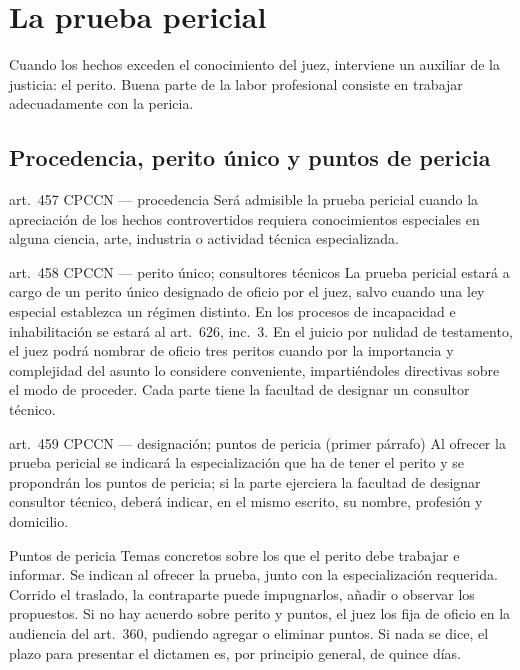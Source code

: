 \documentclass[12pt,oneside]{book}
\begin{document}
\chapter{La prueba pericial}

Cuando los hechos exceden el conocimiento del juez, interviene un auxiliar de la justicia: el perito. Buena parte de la labor profesional consiste en trabajar adecuadamente con la pericia.

\section{Procedencia, perito único y puntos de pericia}

\begin{regla}{art.~457 CPCCN --- procedencia}
Será admisible la prueba pericial cuando la apreciación de los hechos controvertidos requiera conocimientos especiales en alguna ciencia, arte, industria o actividad técnica especializada.
\end{regla}

\begin{regla}{art.~458 CPCCN --- perito único; consultores técnicos}
La prueba pericial estará a cargo de un perito único designado de oficio por el juez, salvo cuando una ley especial establezca un régimen distinto. En los procesos de incapacidad e inhabilitación se estará al art.~626, inc.~3. En el juicio por nulidad de testamento, el juez podrá nombrar de oficio tres peritos cuando por la importancia y complejidad del asunto lo considere conveniente, impartiéndoles directivas sobre el modo de proceder. Cada parte tiene la facultad de designar un consultor técnico.
\end{regla}

\begin{regla}{art.~459 CPCCN --- designación; puntos de pericia (primer párrafo)}
Al ofrecer la prueba pericial se indicará la especialización que ha de tener el perito y se propondrán los puntos de pericia; si la parte ejerciera la facultad de designar consultor técnico, deberá indicar, en el mismo escrito, su nombre, profesión y domicilio.
\end{regla}

\begin{definicion}{Puntos de pericia}
Temas concretos sobre los que el perito debe trabajar e informar. Se indican al ofrecer la prueba, junto con la especialización requerida. Corrido el traslado, la contraparte puede impugnarlos, añadir o observar los propuestos. Si no hay acuerdo sobre perito y puntos, el juez los fija de oficio en la audiencia del art.~360, pudiendo agregar o eliminar puntos. Si nada se dice, el plazo para presentar el dictamen es, por principio general, de quince días.
\end{definicion}
\end{document}
